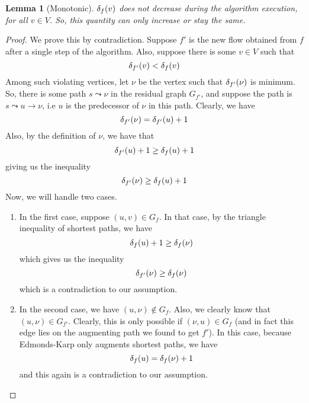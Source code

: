 \documentclass[12pt,a4paper]{amsart}
\numberwithin{equation}{section}
\newtheorem{Lemma}[Th]{Lemma}
\theoremstyle{definition}
\begin{document}
\begin{Lemma}[Monotonic]
	$\delta_{f}(v)$ does not decrease during the algorithm execution, for all $v\in V$. So, this quantity can only increase or stay the same.
\end{Lemma}
\begin{proof}
	We prove this by contradiction. Suppose $f'$ is the new flow obtained from $f$ after a single step of the algorithm. Also, suppose there is some $v\in V$ such that 
	$$\delta_{f'}(v) < \delta_{f}(v)$$
	Among such violating vertices, let $\nu$ be the vertex such that $\delta_{f'}(\nu)$ is minimum. So, there is some path $s\leadsto\nu$ in the residual graph $G_{f'}$, and suppose the path is $s\leadsto u\to\nu$, i.e $u$ is the predecessor of $\nu$ in this path. Clearly, we have 
	$$\delta_{f'}(\nu) = \delta_{f'}(u) + 1$$
	Also, by the definition of $\nu$, we have that 
	$$\delta_{f'}(u) + 1\ge \delta_{f}(u) + 1$$
	giving us the inequality 
	$$\delta_{f'}(\nu)\ge \delta_{f}(u) + 1$$
	Now, we will handle two cases. 
	\begin{enumerate}
		\item In the first case, suppose $(u, v)\in G_f$. In that case, by the triangle inequality of shortest paths, we have 
		$$\delta_{f}(u) + 1\ge \delta_{f}(\nu)$$
		which gives us the inequality 
		$$\delta_{f'}(\nu)\ge \delta_{f}(\nu)$$
		which is a contradiction to our assumption.
		\item In the second case, we have $(u, \nu)\notin G_f$. Also, we clearly know that $(u, \nu)\in G_{f'}$. Clearly, this is only possible if $(\nu, u)\in G_f$ (and in fact this edge lies on the augmenting path we found to get $f'$). In this case, because Edmonds-Karp only augments shortest paths, we have 
		$$\delta_{f}(u) = \delta_{f}(\nu) + 1$$
		and this again is a contradiction to our assumption. 
	\end{enumerate}
\end{proof}
\end{document}
